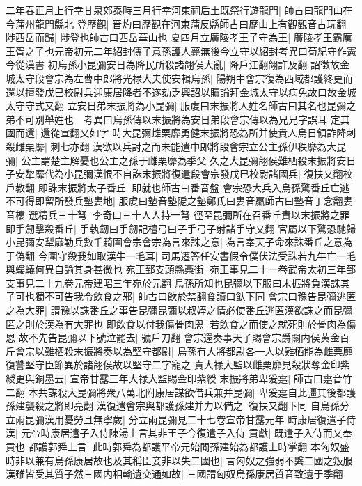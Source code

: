 二年春正月上行幸甘泉郊泰畤三月行幸河東祠后土既祭行遊龍門|{
	師古曰龍門山在今蒲州龍門縣北}
登歷觀|{
	晋灼曰歷觀在河東蒲反縣師古曰歷山上有觀觀音古玩翻}
陟西岳而歸|{
	陟登也師古曰西岳華山也}
夏四月立廣陵孝王子守為王|{
	廣陵孝王霸厲王胥之子也元帝初元二年紹封傳子意孫護人薨無後今立守以紹封考異曰荀紀守作憲今從漢書}
初烏孫小昆彌安日為降民所殺諸翖侯大亂|{
	降戶江翻翖許及翻}
詔徵故金城太守段會宗為左曹中郎將光禄大夫使安輯烏孫|{
	陽朔中會宗復為西域都護終更而還以擅發戊巳校尉兵迎康居降者不遂劾乏興詔以贖論拜金城太守以病免故曰故金城太守守式又翻}
立安日弟末振將為小昆彌|{
	服䖍曰末振將人姓名師古曰其名也昆彌之弟不可别舉姓也　考異曰烏孫傳以末振將為安日弟段會宗傳以為兄兄字誤耳}
定其國而還|{
	還從宣翻又如字}
時大昆彌雌栗靡勇健末振將恐為所并使貴人烏日領詐降刺殺雌栗靡|{
	刺七亦翻}
漢欲以兵討之而未能遣中郎將段會宗立公主孫伊秩靡為大昆彌|{
	公主謂楚主解憂也公主之孫于雌栗靡為季父}
久之大昆彌翖侯難栖殺末振將安日子安犂靡代為小昆彌漢恨不自誅末振將復遣段會宗發戊巳校尉諸國兵|{
	復扶又翻校戶教翻}
即誅末振將太子番丘|{
	即就也師古曰番音盤}
會宗恐大兵入烏孫驚番丘亡逃不可得即留所發兵墊婁地|{
	服䖍曰墊音墊阸之墊鄭氏曰婁音羸師古曰墊音丁念翻婁音樓}
選精兵三十弩|{
	李奇口三十人人持一弩}
徑至昆彌所在召番丘責以末振將之罪即手劒擊殺番丘|{
	手執劒曰手劒記檀弓曰子手弓子射諸手守又翻}
官屬以下驚恐馳歸小昆彌安犁靡勒兵數千騎圍會宗會宗為言來誅之意|{
	為言奉天子命來誅番丘之意為于偽翻}
今圍守殺我如取漢牛一毛耳|{
	司馬遷答任安書假令僕伏法受誅若九牛亡一毛與螻蟻何異自諭其身甚微也}
宛王郅支頭縣槀街|{
	宛王事見二十一卷武帝太初三年郅支事見二十九卷元帝建昭三年宛於元翻}
烏孫所知也昆彌以下服曰末振將負漢誅其子可也獨不可告我令飲食之邪|{
	師古曰飲於禁翻食讀曰飤下同}
會宗曰豫告昆彌逃匿之為大罪|{
	謂豫以誅番丘之事告昆彌昆彌以叔姪之情必使番丘逃匿漢欲誅之而昆彌匿之則於漢為有大罪也}
即飲食以付我傷骨肉恩|{
	若飲食之而使之就死則於骨肉為傷恩}
故不先告昆彌以下號泣罷去|{
	號戶刀翻}
會宗還奏事天子賜會宗爵關内侯黄金百斤會宗以難栖殺末振將奏以為堅守都尉|{
	烏孫有大將都尉各一人以難栖能為雌栗靡復讐堅守臣節異於諸翖侯故以堅守二字寵之}
責大禄大監以雌栗靡見殺狀奪金印紫綬更與銅墨云|{
	宣帝甘露三年大禄大監賜金印紫綬}
末振將弟卑爰疐|{
	師古曰疐音竹二翻}
本共謀殺大昆彌將衆八萬北附康居謀欲借兵兼并昆彌|{
	卑爰疐自此彊其後都護孫建襲殺之將即亮翻}
漢復遣會宗與都護孫建并力以備之|{
	復扶又翻下同}
自烏孫分立兩昆彌漢用憂勞且無寧歲|{
	分立兩昆彌見二十七卷宣帝甘露元年}
時康居復遣子侍漢|{
	元帝時康居遣子入侍陳湯上言其非王子今復遣子入侍}
貢獻|{
	既遣子入侍而又奉貢也}
都護郭舜上言|{
	此時郭舜為都護平帝元始閒孫建始為都護上時掌翻}
本匈奴盛時非以兼有烏孫康居故也及其稱臣妾非以失二國也|{
	言匈奴之強弱不繫二國之叛服}
漢雖皆受其質子然三國内相輸遺交通如故|{
	三國謂匈奴烏孫康居質音致遺于季翻}
